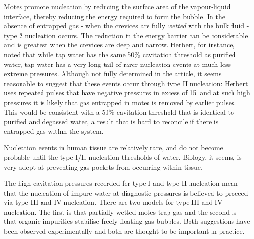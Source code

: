 Motes %
promote nucleation by reducing the surface area of the vapour-liquid interface,
thereby reducing the energy required to form the bubble.
In the absence of entrapped gas - when the crevices are fully {\em wetted} with the bulk fluid -  type 2 nucleation occurs.
The reduction in the energy barrier can be considerable and is greatest when the crevices are deep and narrow\cite{Lubetkin1995}.
Herbert\cite{Herbert2006}, for instance, noted that while tap water has the same 50\% cavitation threshold as purified water,
%
%
tap water has a very long tail of rarer nucleation events at much less extreme pressures.
Although not fully determined in the article, 
it seems reasonable to suggest that these events occur through type II nucleation:
Herbert uses repeated pulses that have negative pressures in excess of \unit{15}\mega\pascal\
and at such high pressures it is likely that gas entrapped in motes is removed 
by earlier pulses.
This would be consistent with a 50\% cavitation threshold that is identical to purified and degassed water,
a result that is hard to reconcile if there is entrapped gas within the system.

Nucleation events in human tissue are relatively rare,
%
and do not become probable until the type I/II nucleation thresholds of water\cite{Webb1988}.
Biology, it seems, is very adept at preventing gas pockets from occurring within tissue.




The high cavitation pressures recorded for type I and type II nucleation 
mean that the nucleation of impure water at diagnostic pressures is believed to proceed via type III and IV nucleation\cite{Atchley1989, Borkent2009, Jones1999}.
There are two models for type III and IV nucleation. 
The first is that  partially wetted motes trap gas\cite{Atchley1989} and  the second is 
that  organic impurities  stabilise freely floating gas bubbles\cite{Yount1979}.
Both suggestions have been observed experimentally\cite{Borkent2009, Johnson1981}
and both are thought to be important in practice.

